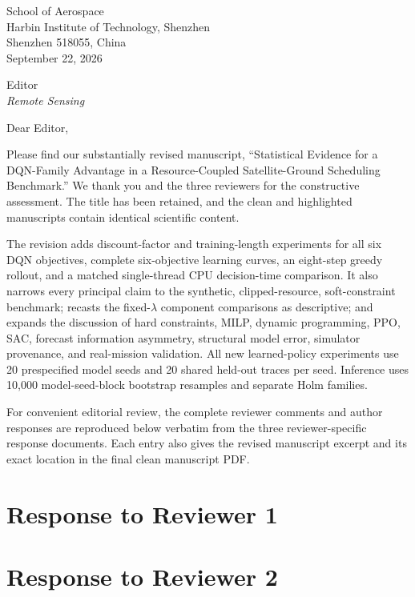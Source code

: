 \documentclass[11pt]{article}
\begin{document}
\begin{flushright}
School of Aerospace\\
Harbin Institute of Technology, Shenzhen\\
Shenzhen 518055, China\\
September 22, 2026
\end{flushright}

Editor\\
\textit{Remote Sensing}

Dear Editor,

Please find our substantially revised manuscript, ``Statistical Evidence for a DQN-Family Advantage in a Resource-Coupled Satellite-Ground Scheduling Benchmark.'' We thank you and the three reviewers for the constructive assessment. The title has been retained, and the clean and highlighted manuscripts contain identical scientific content.

The revision adds discount-factor and training-length experiments for all six DQN objectives, complete six-objective learning curves, an eight-step greedy rollout, and a matched single-thread CPU decision-time comparison. It also narrows every principal claim to the synthetic, clipped-resource, soft-constraint benchmark; recasts the fixed-$\lambda$ component comparisons as descriptive; and expands the discussion of hard constraints, MILP, dynamic programming, PPO, SAC, forecast information asymmetry, structural model error, simulator provenance, and real-mission validation. All new learned-policy experiments use 20 prespecified model seeds and 20 shared held-out traces per seed. Inference uses 10,000 model-seed-block bootstrap resamples and separate Holm families.

For convenient editorial review, the complete reviewer comments and author responses are reproduced below verbatim from the three reviewer-specific response documents. Each entry also gives the revised manuscript excerpt and its exact location in the final clean manuscript PDF.

\section*{Response to Reviewer 1}


\section*{Response to Reviewer 2}

\end{document}
